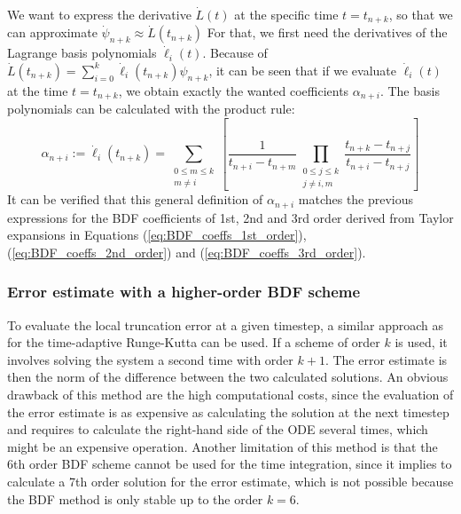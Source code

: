 We want to express the derivative $\dot{L}(t)$ at the specific time $t=t_{n+k}$, so that we can approximate $\dot{\psi}_{n+k} \approx \dot{L}(t_{n+k})$ For that, we first need the derivatives of the Lagrange basis polynomials $\dot{\ell}_i(t)$. Because of $\dot{L}(t_{n+k}) = \sum_{i=0}^{k}\dot{\ell}_i(t_{n+k})\psi_{n+k}$, it can be seen that if we evaluate $\dot{\ell}_i(t)$ at the time $t=t_{n+k}$, we obtain exactly the wanted coefficients $\alpha_{n+i}$. The basis polynomials can be calculated with the product rule:
\begin{equation}
	\alpha_{n+i} := \dot{\ell}_i(t_{n+k}) = \sum_{\substack{0\le m\le k \\m \ne i}}\left[\frac{1}{t_{n+i}-t_{n+m}}\prod_{\substack{0\le j\le k \\j \ne i,m}}\frac{t_{n+k}-t_{n+j}}{t_{n+i}-t_{n+j}}\right]
\end{equation}
It can be verified that this general definition of $\alpha_{n+i}$ matches the previous expressions for the BDF coefficients of 1st, 2nd and 3rd order derived from Taylor expansions in Equations (\ref{eq:BDF_coeffs_1st_order}), (\ref{eq:BDF_coeffs_2nd_order}) and (\ref{eq:BDF_coeffs_3rd_order}).  \\

\subsubsection{Error estimate with a higher-order BDF scheme}
\label{sssec:errorEstimateBDFEmbeddedScheme}
To evaluate the local truncation error at a given timestep, a similar approach as for the time-adaptive Runge-Kutta can be used. If a scheme of order $k$ is used, it involves solving the system a second time with order $k+1$. The error estimate is then the norm of the difference between the two calculated solutions. An obvious drawback of this method are the high computational costs, since the evaluation of the error estimate is as expensive as calculating the solution at the next timestep and requires to calculate the right-hand side of the ODE several times, which might be an expensive operation. Another limitation of this method is that the 6th order BDF scheme cannot be used for the time integration, since it implies to calculate a 7th order solution for the error estimate, which is not possible because the BDF method is only stable up to the order $k=6$. 

